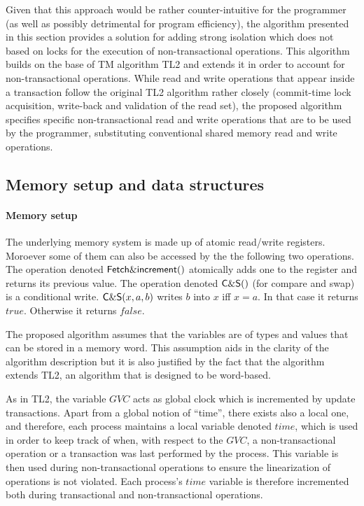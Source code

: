\documentclass[11pt,letterpaper]{article}
\begin{document}
Given that this approach would be rather counter-intuitive for the 
programmer (as well as possibly detrimental for program efficiency), 
the   algorithm presented  in this  section  provides  a solution  for adding
strong isolation which does not based on locks for the execution 
of non-transactional  operations. This  algorithm builds on  the base  of TM
algorithm  TL2 and  extends it in  order to account for  non-transactional 
operations. While read   and write operations that appear inside a 
transaction follow the original TL2 algorithm rather closely (commit-time lock 
acquisition, write-back and validation of the  read set), 
the proposed algorithm 
specifies specific non-transactional read and  write operations 
that are to be used 
by the programmer, substituting conventional
shared memory read and write operations. 


\subsection{Memory setup and data structures}


\paragraph{Memory setup}
The underlying memory system is made up of atomic read/write registers. 
Moroever some of them can also be accessed by the the following two 
operations. The operation denoted 
${\sf Fetch\&increment}()$ atomically adds one to the register and 
returns its previous value. 
 The operation denoted 
${\sf C\&S}()$ (for compare and swap) is a conditional write. 
${\sf C\&S}(x,a,b)$ writes $b$ into $x$ iff $x=a$. In that case it 
returns $\mathit{true}$. Otherwise it returns  $\mathit{false}$. 


The proposed algorithm assumes that the
variables  are  of  types and  values  that  can  be   stored in  a  memory
word. This assumption aids in the clarity of the algorithm description  
but it  is also  justified by the  fact that  the algorithm extends  TL2, an
algorithm that is   designed to be word-based. 

As in TL2,  the variable $\mathit{GVC}$
acts as  global  clock  which  is incremented  by update transactions.
 Apart from a global   notion of ``time'', there exists also
a local one, and therefore, each process maintains a local  
variable denoted $\mathit{time}$,  which is used in order to keep  
track of when, with
respect to the $\mathit{GVC}$, a non-transactional operation 
or a transaction was last performed by
the  process.
This variable is then used during non-transactional operations to ensure
the linearization of operations is not violated.
Each  process's  $\mathit{time}$   variable is   
therefore incremented
both during transactional and non-transactional operations.
\end{document}
